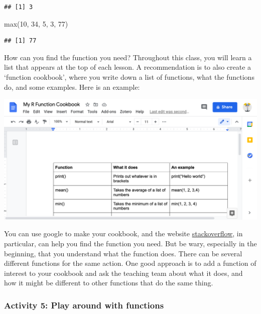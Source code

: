 \documentclass[
]{book}
\newenvironment{Shaded}{\begin{snugshade}}{\end{snugshade}}
\newcommand{\DecValTok}[1]{\textcolor[rgb]{0.00,0.00,0.81}{#1}}
\newcommand{\FunctionTok}[1]{\textcolor[rgb]{0.00,0.00,0.00}{#1}}
\newcommand{\NormalTok}[1]{#1}
\begin{document}
\begin{verbatim}
## [1] 3
\end{verbatim}

\begin{Shaded}
\begin{Highlighting}[]
\FunctionTok{max}\NormalTok{(}\DecValTok{10}\NormalTok{, }\DecValTok{34}\NormalTok{, }\DecValTok{5}\NormalTok{, }\DecValTok{3}\NormalTok{, }\DecValTok{77}\NormalTok{)}
\end{Highlighting}
\end{Shaded}

\begin{verbatim}
## [1] 77
\end{verbatim}

How can you find the function you need? Throughout this class, you will learn a list that appears at the top of each lesson. A recommendation is to also create a `function cookbook', where you write down a list of functions, what the functions do, and some examples. Here is an example:

\includegraphics{img/fn_cookbook.png}

You can use google to make your cookbook, and the website \href{https://stackoverflow.com/}{stackoverflow}, in particular, can help you find the function you need. But be wary, especially in the beginning, that you understand what the function does. There can be several different functions for the same action. One good approach is to add a function of interest to your cookbook and ask the teaching team about what it does, and how it might be different to other functions that do the same thing.

\hypertarget{activity-5-play-around-with-functions}{%
\subsubsection{Activity 5: Play around with functions}\label{activity-5-play-around-with-functions}}
\end{document}
